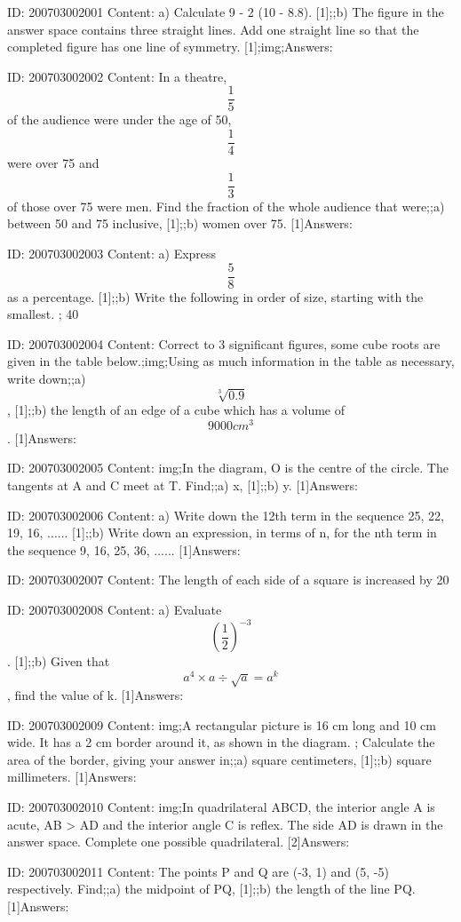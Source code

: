 \documentclass{article}
\begin{document}
ID: 200703002001
Content:
a) Calculate 9 - 2 (10 - 8.8). [1];;b) The figure in the answer space contains three straight lines. Add one straight line so that the completed figure has one line of symmetry. [1];img;Answers:

ID: 200703002002
Content:
In a theatre, $$\frac{1}{5}$$ of the audience were under the age of 50, $$\frac{1}{4} $$ were over 75 and $$\frac{1}{3}$$ of those over 75 were men. Find the fraction of the whole audience that were;;a) between 50 and 75 inclusive, [1];;b) women over 75. [1]Answers:

ID: 200703002003
Content:
a) Express $$\frac{5}{8}$$ as a percentage. [1];;b) Write the following in order of size, starting with the smallest. ; 40%

ID: 200703002004
Content:
Correct to 3 significant figures, some cube roots are given in the table below.;img;Using as much information in the table as necessary, write down;;a) $$\sqrt[3]{0.9}$$ , [1];;b) the length of an edge of a cube which has a volume of $$9000cm^3$$. [1]Answers:

ID: 200703002005
Content:
img;In the diagram, O is the centre of the circle. The tangents at A and C meet at T. Find;;a) x, [1];;b) y. [1]Answers:

ID: 200703002006
Content:
a) Write down the 12th term in the sequence 25, 22, 19, 16, ...... [1];;b) Write down an expression, in terms of n, for the nth term in the sequence 9, 16, 25, 36, ...... [1]Answers:

ID: 200703002007
Content:
The length of each side of a square is increased by 20%

ID: 200703002008
Content:
a) Evaluate $$(\frac{1}{2})^{-3} $$. [1];;b) Given that $$a^{4} \times a \div  \sqrt{a} =a^{k}$$, find the value of k. [1]Answers:

ID: 200703002009
Content:
img;A rectangular picture is 16 cm long and 10 cm wide. It has a 2 cm border around it, as shown in the diagram. ; Calculate the area of the border, giving your answer in;;a) square centimeters, [1];;b) square millimeters. [1]Answers:

ID: 200703002010
Content:
img;In quadrilateral ABCD, the interior angle A is acute, AB > AD and the interior angle C is reflex. The side AD is drawn in the answer space. Complete one possible quadrilateral. [2]Answers:

ID: 200703002011
Content:
The points P and Q are (-3, 1) and (5, -5) respectively. Find;;a) the midpoint of PQ, [1];;b) the length of the line PQ. [1]Answers:
\end{document}
